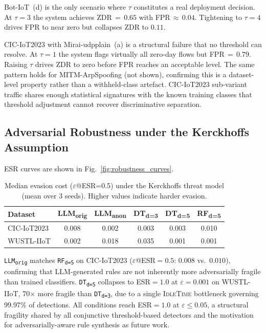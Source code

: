 Bot-IoT~(d) is the only scenario where $\tau$ constitutes a real
deployment decision. At $\tau=3$ the system achieves ZDR\,$=\,0.65$
with FPR\,$\approx\,0.04$. Tightening to $\tau=4$ drives FPR to
near zero but collapses ZDR to $0.11$.

CIC-IoT2023 with Mirai-udpplain~(a) is a structural failure that no
threshold can resolve. At $\tau=1$ the system flags virtually all
zero-day flows but FPR\,$=\,0.79$. Raising $\tau$ drives ZDR to zero
before FPR reaches an acceptable level. The same pattern holds for
MITM-ArpSpoofing (not shown), confirming this is a dataset-level
property rather than a withheld-class artefact. CIC-IoT2023 sub-variant traffic shares enough statistical signatures with the known training classes that threshold adjustment cannot recover discriminative separation.

\subsection{Adversarial Robustness under the Kerckhoffs Assumption}
\label{sec:kerckhoffs}

ESR curves are shown in Fig.~\ref{fig:robustness_curves}.

\begin{table}[htbp]
  \centering
  \caption{Median evasion cost ($\varepsilon$@ESR=0.5) under the Kerckhoffs threat
           model (mean over 3 seeds). Higher values indicate harder evasion.}
  \label{tab:kerckhoffs}
  \begin{tabular}{lccccc}
    \toprule
    \textbf{Dataset} & \textbf{LLM\textsubscript{orig}} & \textbf{LLM\textsubscript{anon}} &
    \textbf{DT\textsubscript{d=3}} & \textbf{DT\textsubscript{d=5}} &
    \textbf{RF\textsubscript{d=5}} \\
    \midrule
    CIC-IoT2023 & 0.008 & 0.002 & 0.003 & 0.003 & 0.010 \\
    WUSTL-IIoT  & 0.002 & 0.018 & 0.035 & 0.001 & 0.001 \\
    \bottomrule
  \end{tabular}
\end{table}

\texttt{LLM\textsubscript{orig}} matches \texttt{RF\textsubscript{d=5}} on CIC-IoT2023 ($\varepsilon$@ESR$=0.5$: $0.008$ vs.\ $0.010$), confirming that LLM-generated rules are not inherently more adversarially fragile than trained classifiers. \texttt{DT\textsubscript{d=5}} collapses to ESR${=}1.0$ at $\varepsilon{=}0.001$ on WUSTL-IIoT, 70$\times$ more fragile than \texttt{DT\textsubscript{d=3}}, due to a single \textsc{IdleTime} bottleneck governing 99.97\% of detections. All conditions reach ESR${=}1.0$ at $\varepsilon \leq 0.05$, a structural fragility shared by all conjunctive threshold-based detectors and the motivation for adversarially-aware rule synthesis as future work.

